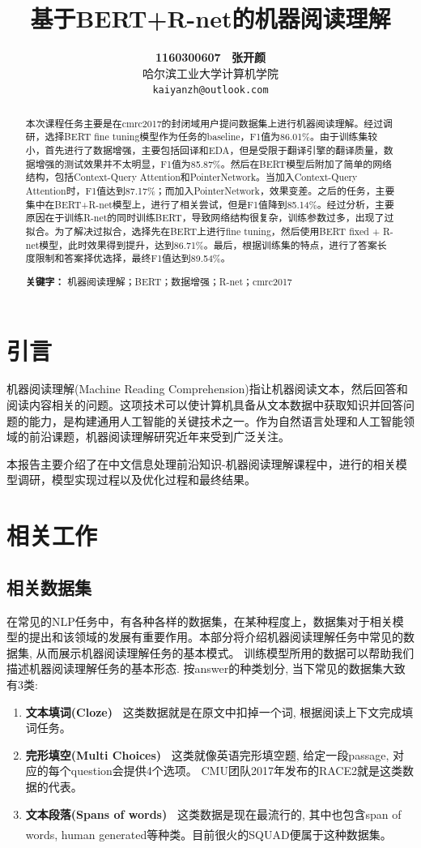 \documentclass[10pt, a4]{extarticle}
\title{\textbf{基于BERT+R-net的机器阅读理解}}
\author{\textbf{1160300607 \ 张开颜} \\ 哈尔滨工业大学计算机学院 \\ \texttt{kaiyanzh@outlook.com}}
\date{}
\newcommand{\upcite}[1]{\textsuperscript{\textsuperscript{\cite{#1}}}}
\begin{document}
\maketitle

\renewcommand{\abstractname}{摘要}
\begin{abstract}
	本次课程任务主要是在cmrc2017的封闭域用户提问数据集上进行机器阅读理解。经过调研，选择BERT fine tuning模型作为任务的baseline，F1值为86.01\%。由于训练集较小，首先进行了数据增强，主要包括回译和EDA，但是受限于翻译引擎的翻译质量，数据增强的测试效果并不太明显，F1值为85.87\%。然后在BERT模型后附加了简单的网络结构，包括Context-Query Attention和PointerNetwork。当加入Context-Query Attention时，F1值达到87.17\%；而加入PointerNetwork，效果变差。之后的任务，主要集中在BERT+R-net模型上，进行了相关尝试，但是F1值降到85.14\%。经过分析，主要原因在于训练R-net的同时训练BERT，导致网络结构很复杂，训练参数过多，出现了过拟合。为了解决过拟合，选择先在BERT上进行fine tuning，然后使用BERT fixed + R-net模型，此时效果得到提升，达到86.71\%。最后，根据训练集的特点，进行了答案长度限制和答案择优选择，最终F1值达到89.54\%。
	
	\textbf{关键字：} 机器阅读理解；BERT；数据增强；R-net；cmrc2017
\end{abstract}

\setcounter{section}{-1}
\section{引言}
机器阅读理解(Machine Reading Comprehension)指让机器阅读文本，然后回答和阅读内容相关的问题。这项技术可以使计算机具备从文本数据中获取知识并回答问题的能力，是构建通用人工智能的关键技术之一。作为自然语言处理和人工智能领域的前沿课题，机器阅读理解研究近年来受到广泛关注。

本报告主要介绍了在中文信息处理前沿知识-机器阅读理解课程中，进行的相关模型调研，模型实现过程以及优化过程和最终结果。

\section{相关工作}
\subsection{相关数据集}
在常见的NLP任务中，有各种各样的数据集，在某种程度上，数据集对于相关模型的提出和该领域的发展有重要作用。本部分将介绍机器阅读理解任务中常见的数据集, 从而展示机器阅读理解任务的基本模式。
训练模型所用的数据可以帮助我们描述机器阅读理解任务的基本形态. 按answer的种类划分, 当下常见的数据集大致有3类:
\begin{enumerate}
	\item \textbf{文本填词(Cloze)\ } 这类数据就是在原文中扣掉一个词, 根据阅读上下文完成填词任务。
	\item \textbf{完形填空(Multi Choices)\ } 这类就像英语完形填空题, 给定一段passage, 对应的每个question会提供4个选项。 CMU团队2017年发布的RACE2就是这类数据的代表。
	\item \textbf{文本段落(Spans of words)\ } 这类数据是现在最流行的, 其中也包含span of words, human generated等种类。目前很火的SQUAD\upcite{squad}便属于这种数据集。
\end{enumerate}
\end{document}
